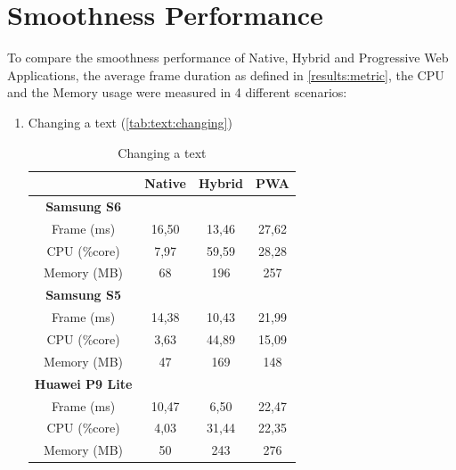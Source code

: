 \iffalse
\section{Smoothness Performance}

To compare the smoothness performance of Native, Hybrid and Progressive Web Applications, the average frame duration as defined in \autoref{results:metric}, the CPU and the Memory usage were measured in 4 different scenarios: 
\begin{enumerate} [ref={Scenario}\xspace\arabic*]
    \item \label{scenario:text:changing} Changing a text (\autoref{tab:text:changing})
    \begin{table}[]
        \centering
        \begin{tabular}{|c|c|c|c|}
            \hline
             & Native & Hybrid & PWA \\
             \hline
            \textbf{Samsung S6} &   &   &   \\
            Frame (ms) & 16,50 & 13,46 & 27,62 \\
            CPU (\%core) & 7,97 & 59,59 & 28,28 \\
            Memory (MB) & 68 & 196 & 257 \\
            \hline   
            \textbf{Samsung S5} &   &   &   \\
            Frame (ms) & 14,38 & 10,43 & 21,99 \\
            CPU (\%core) & 3,63 & 44,89 & 15,09 \\
            Memory (MB) & 47 & 169 & 148 \\
            \hline
            \textbf{Huawei P9 Lite} &   &   &   \\
            Frame (ms) & 10,47 & 6,50 & 22,47 \\
            CPU (\%core) & 4,03 & 31,44 & 22,35 \\
            Memory (MB) & 50 & 243 & 276 \\
            \hline
        \end{tabular}
        \caption{Changing a text}
        \label{tab:text:changing}
    \end{table}


\end{enumerate}
